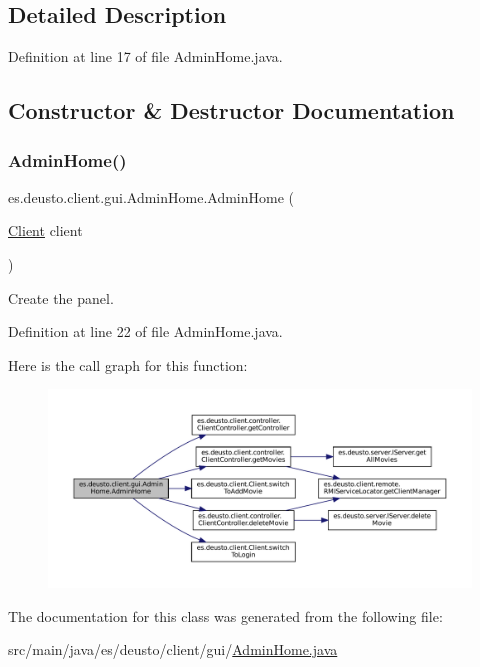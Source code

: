 \subsection{Detailed Description}


Definition at line 17 of file Admin\+Home.\+java.



\subsection{Constructor \& Destructor Documentation}
\mbox{\label{classes_1_1deusto_1_1client_1_1gui_1_1_admin_home_a5140cdda5a5938ba3f3763ad1fd542ca}} 
\subsubsection{\texorpdfstring{AdminHome()}{AdminHome()}}
{\footnotesize\ttfamily es.\+deusto.\+client.\+gui.\+Admin\+Home.\+Admin\+Home (\begin{DoxyParamCaption}\item[{\mbox{\hyperlink{classes_1_1deusto_1_1client_1_1_client}{Client}}}]{client }\end{DoxyParamCaption})}

Create the panel. 

Definition at line 22 of file Admin\+Home.\+java.

Here is the call graph for this function\+:
\nopagebreak
\begin{figure}[H]
\begin{center}
\leavevmode
\includegraphics[width=350pt]{classes_1_1deusto_1_1client_1_1gui_1_1_admin_home_a5140cdda5a5938ba3f3763ad1fd542ca_cgraph}
\end{center}
\end{figure}


The documentation for this class was generated from the following file\+:\begin{DoxyCompactItemize}
\item 
src/main/java/es/deusto/client/gui/\mbox{\hyperlink{_admin_home_8java}{Admin\+Home.\+java}}\end{DoxyCompactItemize}
